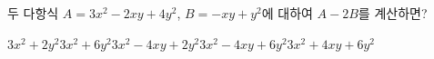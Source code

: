 두 다항식 $A=3x^2-2xy+4y^2$, $B=-xy+y^2$에 대하여 $A-2B$를 계산하면?
\begin{choicesii}{$3x^2+2y^2$}{$3x^2+6y^2$}{$3x^2-4xy+2y^2$}{$3x^2-4xy+6y^2$}{$3x^2+4xy+6y^2$}\end{choicesii}
